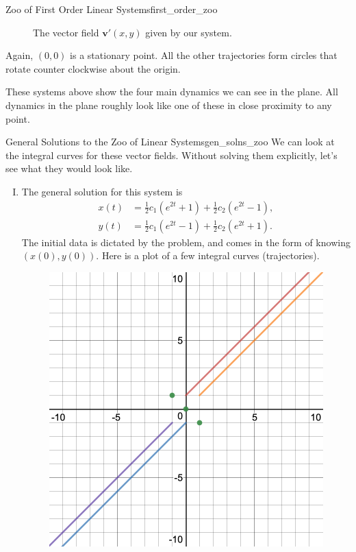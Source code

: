\begin{ex}{Zoo of First Order Linear Systems}{first_order_zoo}
\begin{enumerate}[(I)]
\begin{figure}[H]
                \caption{The vector field $\mathbf{v}'(x,y)$ given by our system.}
                \label{fig:my_label}
            \end{figure}
            Again, $(0,0)$ is a stationary point.  All the other trajectories form circles that rotate counter clockwise about the origin.
        \end{enumerate}
        \end{ex}
        
        These systems above show the four main dynamics we can see in the plane. All dynamics in the plane roughly look like one of these in close proximity to any point.
        
        \begin{ex}{General Solutions to the Zoo of Linear Systems}{gen_solns_zoo}
        We can look at the integral curves for these vector fields.  Without solving them explicitly, let's see what they would look like.
        \begin{enumerate}[(I)]
            \item The general solution for this system is
            \begin{align*}
                x(t)&= \frac{1}{2}c_1 \left( e^{2t}+1\right)+\frac{1}{2}c_2\left(e^{2t}-1\right),\\
                y(t)&=\frac{1}{2}c_1 \left( e^{2t}-1\right)+\frac{1}{2}c_2\left(e^{2t}+1\right).
            \end{align*}
            The initial data is dictated by the problem, and comes in the form of knowing $(x(0),y(0))$.  Here is a plot of a few integral curves (trajectories).
            \begin{figure}[H]
                \centering
                \includegraphics[width=.6\textwidth]{Figures/x+yx+yintegralcurves.png}

\end{figure}
\end{enumerate}
\end{ex}
